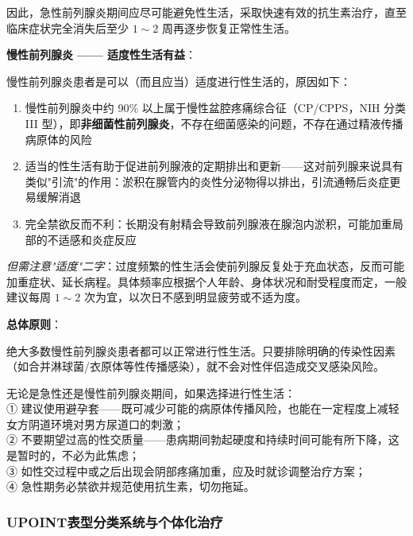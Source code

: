 因此，急性前列腺炎期间应尽可能避免性生活，采取快速有效的抗生素治疗，直至临床症状完全消失后至少 $1\sim2$ 周再逐步恢复正常性生活。

\vspace{0.5em}
\noindent\textbf{慢性前列腺炎 —— 适度性生活有益}：

慢性前列腺炎患者是可以（而且应当）适度进行性生活的，原因如下：

\begin{enumerate}
	\item 慢性前列腺炎中约 90\% 以上属于慢性盆腔疼痛综合征（CP/CPPS，NIH 分类 III 型），即\textbf{非细菌性前列腺炎}，不存在细菌感染的问题，不存在通过精液传播病原体的风险

	\item 适当的性生活有助于促进前列腺液的定期排出和更新——这对前列腺来说具有类似"引流"的作用：淤积在腺管内的炎性分泌物得以排出，引流通畅后炎症更易缓解消退

	\item 完全禁欲反而不利：长期没有射精会导致前列腺液在腺泡内淤积，可能加重局部的不适感和炎症反应
\end{enumerate}

\noindent\textit{但需注意"适度"二字}：过度频繁的性生活会使前列腺反复处于充血状态，反而可能加重症状、延长病程。具体频率应根据个人年龄、身体状况和耐受程度而定，一般建议每周 $1\sim2$ 次为宜，以次日不感到明显疲劳或不适为度。

\vspace{0.5em}
\noindent\textbf{总体原则}：

绝大多数慢性前列腺炎患者都可以正常进行性生活。只要排除明确的传染性因素（如合并淋球菌/衣原体等性传播感染），就不会对性伴侣造成交叉感染风险。

\begin{tcolorbox}[colback=pink!5!white,colframe=red!50!black,title=贴心小叮咛]
无论是急性还是慢性前列腺炎期间，如果选择进行性生活：\\
① 建议使用避孕套——既可减少可能的病原体传播风险，也能在一定程度上减轻女方阴道环境对男方尿道口的刺激；\\
② 不要期望过高的性交质量——患病期间勃起硬度和持续时间可能有所下降，这是暂时的，不必为此焦虑；\\
③ 如性交过程中或之后出现会阴部疼痛加重，应及时就诊调整治疗方案；\\
④ 急性期务必禁欲并规范使用抗生素，切勿拖延。
\end{tcolorbox}

\subsubsection{UPOINT表型分类系统与个体化治疗}
\label{subsec:upoint}

